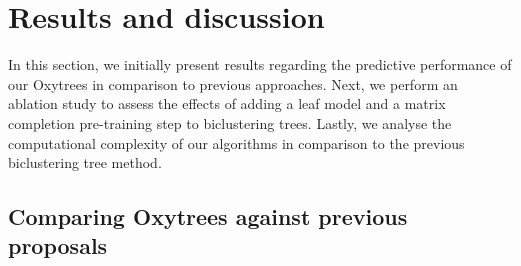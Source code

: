 \documentclass[sn-mathphys-num]{sn-jnl}%
\theoremstyle{thmstyleone}%
\theoremstyle{thmstyletwo}%
\theoremstyle{thmstylethree}%
\begin{document}



\section{Results and discussion}
\label{sec:results}
\FloatBarrier

In this section, we initially present results regarding the predictive performance of our Oxytrees in comparison to previous approaches. Next, we perform an ablation study to assess the effects of adding a leaf model and a matrix completion pre-training step to biclustering trees. Lastly, we analyse the computational complexity of our algorithms in comparison to the previous biclustering tree method.


\subsection{Comparing Oxytrees against previous proposals}
\label{sec:literature comparison}




\end{document}
